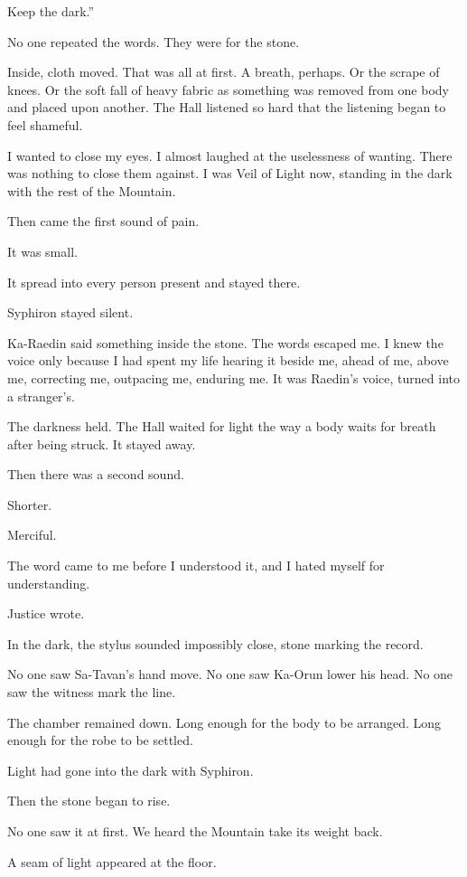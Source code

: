 Keep the dark.''\par
No one repeated the words.
They were for the stone.\par
Inside, cloth moved.
That was all at first.
A breath, perhaps.
Or the scrape of knees.
Or the soft fall of heavy fabric as something was removed from one body and placed upon another.
The Hall listened so hard that the listening began to feel shameful.\par
I wanted to close my eyes.
I almost laughed at the uselessness of wanting.
There was nothing to close them against.
I was Veil of Light now, standing in the dark with the rest of the Mountain.\par
Then came the first sound of pain.\par
It was small.\par
It spread into every person present and stayed there.\par
Syphiron stayed silent.\par
Ka-Raedin said something inside the stone.
The words escaped me.
I knew the voice only because I had spent my life hearing it beside me, ahead of me, above me, correcting me, outpacing me, enduring me.
It was Raedin's voice, turned into a stranger's.\par
The darkness held.
The Hall waited for light the way a body waits for breath after being struck.
It stayed away.\par
Then there was a second sound.\par
Shorter.\par
Merciful.\par
The word came to me before I understood it, and I hated myself for understanding.\par
Justice wrote.\par
In the dark, the stylus sounded impossibly close, stone marking the record.\par
No one saw Sa-Tavan's hand move.
No one saw Ka-Orun lower his head.
No one saw the witness mark the line.\par
The chamber remained down.
Long enough for the body to be arranged.
Long enough for the robe to be settled.\par
Light had gone into the dark with Syphiron.\par
Then the stone began to rise.\par
No one saw it at first.
We heard the Mountain take its weight back.\par
A seam of light appeared at the floor.\par
